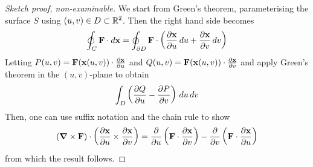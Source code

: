 \documentclass{../template/note}
\begin{document}
    \begin{proof}[Sketch proof, non-examinable]
        We start from Green's theorem, parameterising the surface \(S\) using \((u, v) \in D \subset \mathbb R^2\). Then the right hand side becomes
        \begin{align*}
            \oint_C \V F \cdot d\V x = \oint_{\pr D} \V F \cdot \left(\pd{\V x} u \D u + \pd{\V x}v \D v\right)
        \end{align*}
        Letting \(P(u, v) = \V F(\V x(u, v)) \cdot \pd{\V x}u\) and \(Q(u, v) = \V F(\V x(u, v)) \cdot \pd{\V x}v\) and apply Green's theorem in the \((u, v)\)-plane to obtain
        \begin{align*}
            \int_D \left(\pd Q u - \pd P v\right) \D u \D v
        \end{align*}
        Then, one can use suffix notation and the chain rule to show
        \begin{align*}
            (\curl \V F) \cdot \left(\pd{\V x}u \times \pd{\V x}v\right) = \pd{}{u} \left(\V F \cdot \pd{\V x}v \right) - \pd{}{v} \left(\V F \cdot \pd{\V x}u\right)
        \end{align*}
        from which the result follows.
    \end{proof}
    
\end{document}
